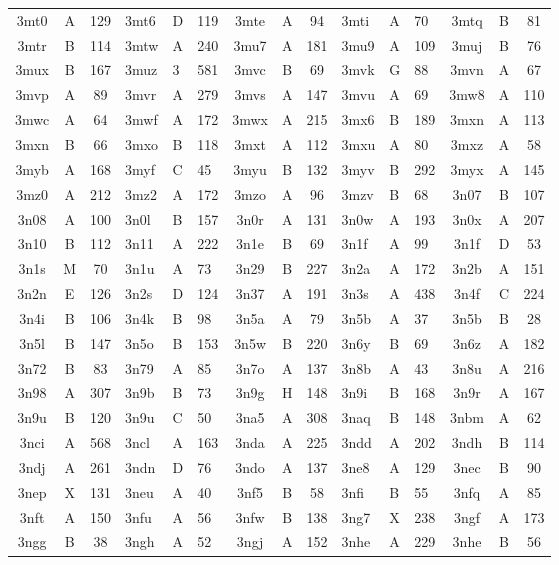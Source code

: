 \begin{longtable}{|c|c|c| a|a|a| c|c|c| a|a|a| c|c|c|}
3mt0 & A & 129 & 3mt6 & D & 119 & 3mte & A & 94 & 3mti & A & 70 & 3mtq & B & 81\\
3mtr & B & 114 & 3mtw & A & 240 & 3mu7 & A & 181 & 3mu9 & A & 109 & 3muj & B & 76\\
3mux & B & 167 & 3muz & 3 & 581 & 3mvc & B & 69 & 3mvk & G & 88 & 3mvn & A & 67\\
3mvp & A & 89 & 3mvr & A & 279 & 3mvs & A & 147 & 3mvu & A & 69 & 3mw8 & A & 110\\
3mwc & A & 64 & 3mwf & A & 172 & 3mwx & A & 215 & 3mx6 & B & 189 & 3mxn & A & 113\\
3mxn & B & 66 & 3mxo & B & 118 & 3mxt & A & 112 & 3mxu & A & 80 & 3mxz & A & 58\\
3myb & A & 168 & 3myf & C & 45 & 3myu & B & 132 & 3myv & B & 292 & 3myx & A & 145\\
3mz0 & A & 212 & 3mz2 & A & 172 & 3mzo & A & 96 & 3mzv & B & 68 & 3n07 & B & 107\\
3n08 & A & 100 & 3n0l & B & 157 & 3n0r & A & 131 & 3n0w & A & 193 & 3n0x & A & 207\\
3n10 & B & 112 & 3n11 & A & 222 & 3n1e & B & 69 & 3n1f & A & 99 & 3n1f & D & 53\\
3n1s & M & 70 & 3n1u & A & 73 & 3n29 & B & 227 & 3n2a & A & 172 & 3n2b & A & 151\\
3n2n & E & 126 & 3n2s & D & 124 & 3n37 & A & 191 & 3n3s & A & 438 & 3n4f & C & 224\\
3n4i & B & 106 & 3n4k & B & 98 & 3n5a & A & 79 & 3n5b & A & 37 & 3n5b & B & 28\\
3n5l & B & 147 & 3n5o & B & 153 & 3n5w & B & 220 & 3n6y & B & 69 & 3n6z & A & 182\\
3n72 & B & 83 & 3n79 & A & 85 & 3n7o & A & 137 & 3n8b & A & 43 & 3n8u & A & 216\\
3n98 & A & 307 & 3n9b & B & 73 & 3n9g & H & 148 & 3n9i & B & 168 & 3n9r & A & 167\\
3n9u & B & 120 & 3n9u & C & 50 & 3na5 & A & 308 & 3naq & B & 148 & 3nbm & A & 62\\
3nci & A & 568 & 3ncl & A & 163 & 3nda & A & 225 & 3ndd & A & 202 & 3ndh & B & 114\\
3ndj & A & 261 & 3ndn & D & 76 & 3ndo & A & 137 & 3ne8 & A & 129 & 3nec & B & 90\\
3nep & X & 131 & 3neu & A & 40 & 3nf5 & B & 58 & 3nfi & B & 55 & 3nfq & A & 85\\
3nft & A & 150 & 3nfu & A & 56 & 3nfw & B & 138 & 3ng7 & X & 238 & 3ngf & A & 173\\
3ngg & B & 38 & 3ngh & A & 52 & 3ngj & A & 152 & 3nhe & A & 229 & 3nhe & B & 56\\

\end{longtable}
